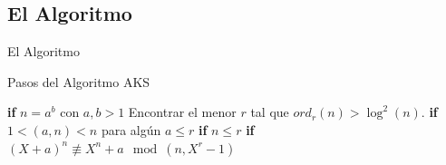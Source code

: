 \documentclass{beamer}
\begin{document}
\subsection{El Algoritmo}

\begin{frame}
	\centering
	\begin{Large}
		El Algoritmo
	\end{Large}
\end{frame}

\begin{frame}[fragile]{Pasos del Algoritmo AKS}
	\begin{algorithm}[H]
		\caption{AKS}
		\begin{algorithmic}
				\State \textbf{if} $n = a^b$ con $a, b > 1$ \medskip
				\State Encontrar el menor $r$ tal que $ord_r(n) > \log^2(n)$.\medskip
				\State \textbf{if} $1 < (a, n) < n$ para algún $a \leq r$ \medskip
				\State \textbf{if} $n \leq r$ \medskip
					\State \textbf{if} $(X + a)^n \not\equiv X^n + a \mod(n, X^r - 1)$ 
				\EndFor\medskip
				\State {}
			\EndProcedure
		\end{algorithmic}
	\end{algorithm}
\end{frame}
\end{document}
